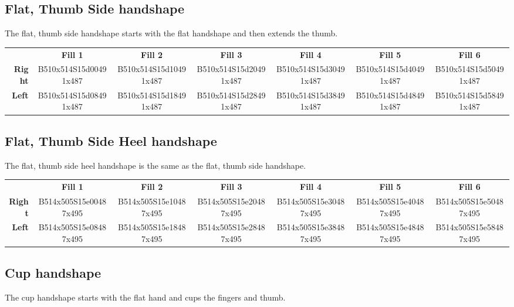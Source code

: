 \documentclass{article}
\begin{document}
\subsection{Flat, Thumb Side handshape}

The flat, thumb side handshape starts with the flat handshape and then extends the thumb.

\begin{center}
\begin{tabular}{r*{6}{c}}
&\textbf{Fill 1}&\textbf{Fill 2}&\textbf{Fill 3}&\textbf{Fill 4}&\textbf{Fill 5}&\textbf{Fill 6}\\
\textbf{Right}&
B510x514S15d00491x487&
B510x514S15d10491x487&
B510x514S15d20491x487&
B510x514S15d30491x487&
B510x514S15d40491x487&
B510x514S15d50491x487\\
\textbf{Left}&
B510x514S15d08491x487&
B510x514S15d18491x487&
B510x514S15d28491x487&
B510x514S15d38491x487&
B510x514S15d48491x487&
B510x514S15d58491x487\\
\end{tabular}
\end{center}

\subsection{Flat, Thumb Side Heel handshape}

The flat, thumb side heel handshape is the same as the flat, thumb side handshape.

\begin{center}
\begin{tabular}{r*{6}{c}}
&\textbf{Fill 1}&\textbf{Fill 2}&\textbf{Fill 3}&\textbf{Fill 4}&\textbf{Fill 5}&\textbf{Fill 6}\\
\textbf{Right}&
B514x505S15e00487x495&
B514x505S15e10487x495&
B514x505S15e20487x495&
B514x505S15e30487x495&
B514x505S15e40487x495&
B514x505S15e50487x495\\
\textbf{Left}&
B514x505S15e08487x495&
B514x505S15e18487x495&
B514x505S15e28487x495&
B514x505S15e38487x495&
B514x505S15e48487x495&
B514x505S15e58487x495\\
\end{tabular}
\end{center}

\subsection{Cup handshape}

The cup handshape starts with the flat hand and cups the fingers and thumb.
\end{document}
